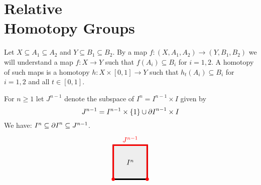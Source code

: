 

\chapter[Relative Homotopy Groups]{Relative \\ Homotopy Groups}
\label{RELATIVE HOMOTOPY GPS CHAPTER}
\thispagestyle{firststyle}

\begin{notation}
Let $X \subseteq A_{1} \subseteq A_{2}$ and $Y \subseteq B_{1}\subseteq B_{2}$. 
By a map $f\colon (X, A_{1}, A_{2}) \to (Y, B_{1}, B_{2})$ we will understand 
a map $f\colon X\to Y$ such that $f(A_{i})\subseteq B_{i}$ for $i=1, 2$. 
A homotopy of such maps is a homotopy $h\colon X\times [0, 1] \to Y$ such that 
$h_{t}(A_{i})\subseteq B_{i}$ for $i=1, 2$ and all $t\in [0, 1]$. 
\end{notation}


\begin{notation}
For $n\geq 1$ let $J^{n-1}$ denote the subspace of $I^{n} = I^{n-1}\times I$ given by 
\[
J^{n-1} = I^{n-1}\times \{1\} \cup {\partial I}^{n-1}\times I
\]
We have: $I^{n} \subseteq {\partial I}^{n} \subseteq J^{n-1}$.
\begin{equation*}
\begin{tikzpicture}[scale=1.7]
\filldraw[line width=2pt, fill=mygray1] (0, 0) rectangle (1, 1) node[pos=0.5] {$I^{n}$};
\draw[red, line width=2pt, cap=rect] (0, 0) -- (0, 1) -- node[above] {$J^{n-1}$}
(1, 1) -- (1, 0);
\fill[red] (0, 0) circle (0.05);
\fill[red] (1, 0) circle (0.05);
\end{tikzpicture}
\end{equation*}


\end{notation}


